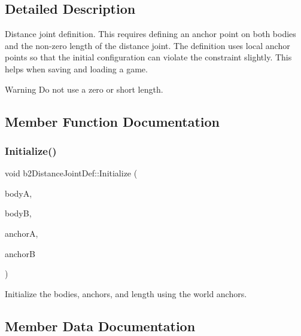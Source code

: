 \subsection{Detailed Description}
Distance joint definition. This requires defining an anchor point on both bodies and the non-\/zero length of the distance joint. The definition uses local anchor points so that the initial configuration can violate the constraint slightly. This helps when saving and loading a game. \begin{DoxyWarning}{Warning}
Do not use a zero or short length. 
\end{DoxyWarning}


\subsection{Member Function Documentation}
\mbox{\label{structb2_distance_joint_def_a99788a534638cc28cd1e44e0036503f0}} 
\subsubsection{\texorpdfstring{Initialize()}{Initialize()}}
{\footnotesize\ttfamily void b2\+Distance\+Joint\+Def\+::\+Initialize (\begin{DoxyParamCaption}\item[{\hyperlink{classb2_body}{b2\+Body} $\ast$}]{bodyA,  }\item[{\hyperlink{classb2_body}{b2\+Body} $\ast$}]{bodyB,  }\item[{const \hyperlink{structb2_vec2}{b2\+Vec2} \&}]{anchorA,  }\item[{const \hyperlink{structb2_vec2}{b2\+Vec2} \&}]{anchorB }\end{DoxyParamCaption})}

Initialize the bodies, anchors, and length using the world anchors. 

\subsection{Member Data Documentation}
\mbox{\label{structb2_distance_joint_def_a35e2362bcb6c58734f95d0ac045863ea}} 
